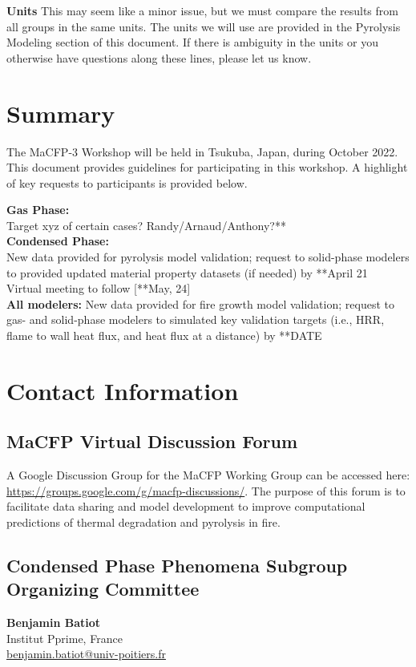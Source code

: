 \documentclass[12pt]{article}
\begin{document}
\textbf{Units}
This may seem like a minor issue, but we must compare the results from all groups in the same units. The units we will use are provided in the Pyrolysis Modeling section of this document. If there is ambiguity in the units or you otherwise have questions along these lines, please let us know.

\clearpage
\section{Summary}
The MaCFP-3 Workshop will be held in Tsukuba, Japan, during October 2022. This document provides guidelines for participating in this workshop. A highlight of key requests to participants is provided below.

\textbf{Gas Phase:}\\
Target xyz of certain cases? Randy/Arnaud/Anthony?**\\

\textbf{Condensed Phase:}\\
New data provided for pyrolysis model validation; request to solid-phase modelers to provided updated material property datasets (if needed) by **April 21\\
Virtual meeting to follow [**May, 24]\\

\textbf{All modelers:}
New data provided for fire growth model validation; request to gas- and solid-phase modelers to simulated key validation targets (i.e., HRR, flame to wall heat flux, and heat flux at a distance) by **DATE\\


\clearpage
\section{Contact Information}
 \subsection*{MaCFP Virtual Discussion Forum}
A Google Discussion Group for the MaCFP Working Group can be accessed here: \url{https://groups.google.com/g/macfp-discussions/}. The purpose of this forum is to facilitate data sharing and model development to improve computational predictions of thermal degradation and pyrolysis in fire.

\subsection*{Condensed Phase Phenomena Subgroup Organizing Committee}
\setlength{\parindent}{0cm}
\textbf{Benjamin Batiot} \\
Institut Pprime, France \\
    \quad\href{mailto:benjamin.batiot@univ-poitiers.fr }{benjamin.batiot@univ-poitiers.fr }
    \vspace{0.5cm}
    
\end{document}

